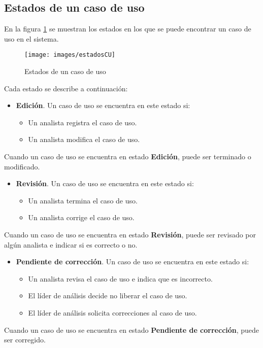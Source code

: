 {{{{\subsection{Estados de un caso de uso}

En la figura \ref{estadosCU} se muestran los \hypertarget{edoCU}{estados} en los que se puede encontrar un caso de uso en el sistema.

	\begin{figure}[H]
		\texttt{[image: images/estadosCU]}
		\caption{Estados de un caso de uso}
		\label{estadosCU}
	\end{figure}

	Cada estado se describe a continuación:
	\begin{itemize}
		\item \textbf{Edición}. Un caso de uso se encuentra en este estado si:
			\begin{itemize}
				\item Un analista registra el caso de uso.
				\item Un analista modifica el caso de uso.
			\end{itemize}
	\end{itemize}
	Cuando un caso de uso se encuentra en estado \textbf{Edición}, puede ser terminado o modificado.
	
	\begin{itemize}
		\item \textbf{Revisión}. Un caso de uso se encuentra en este estado si:
		\begin{itemize}
			\item Un analista termina el caso de uso.
			\item Un analista corrige el caso de uso.
		\end{itemize}
	\end{itemize}
	Cuando un caso de uso se encuentra en estado \textbf{Revisión}, puede ser revisado por algún analista e indicar si es correcto o no.
	
	\begin{itemize}
		\item \textbf{Pendiente de corrección}. Un caso de uso se encuentra en este estado si:
		\begin{itemize}
			\item Un analista revisa el caso de uso e indica que es incorrecto.
			\item El líder de análisis decide no liberar el caso de uso.
			\item El líder de análisis solicita correcciones al caso de uso.
		\end{itemize}
	\end{itemize}
	Cuando un caso de uso se encuentra en estado \textbf{Pendiente de corrección}, puede ser corregido.
	
}}}}
